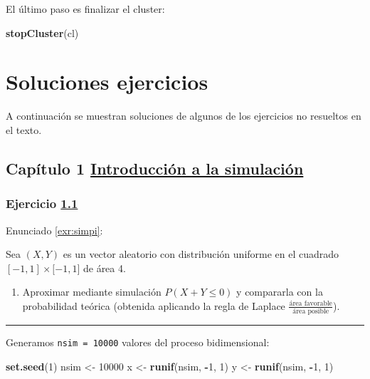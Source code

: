 \documentclass[
  spanish,
  10pt,
]{book}
\newenvironment{Shaded}{\begin{snugshade}}{\end{snugshade}}
\newcommand{\DecValTok}[1]{\textcolor[rgb]{0.00,0.00,0.81}{#1}}
\newcommand{\FunctionTok}[1]{\textcolor[rgb]{0.13,0.29,0.53}{\textbf{#1}}}
\newcommand{\NormalTok}[1]{#1}
\newcommand{\OtherTok}[1]{\textcolor[rgb]{0.56,0.35,0.01}{#1}}
\newcommand{\SpecialCharTok}[1]{\textcolor[rgb]{0.81,0.36,0.00}{\textbf{#1}}}
\providecommand{\tightlist}{%
  \setlength{\itemsep}{0pt}\setlength{\parskip}{0pt}}
\theoremstyle{break}
\theoremstyle{nonumberplain}
\begin{document}
El último paso es finalizar el cluster:

\begin{Shaded}
\begin{Highlighting}[]
\FunctionTok{stopCluster}\NormalTok{(cl)}
\end{Highlighting}
\end{Shaded}

\chapter{Soluciones ejercicios}\label{soluciones}

A continuación se muestran soluciones de algunos de los ejercicios no resueltos en el texto.

\section{\texorpdfstring{Capítulo 1 \href{intro.html}{Introducción a la simulación}}{Capítulo 1 Introducción a la simulación}}\label{capuxedtulo-1-introducciuxf3n-a-la-simulaciuxf3n}

\subsection{\texorpdfstring{Ejercicio \href{ejercicios.html\#exr:simpi}{1.1}}{Ejercicio 1.1}}\label{sol-simpi}

Enunciado \ref{exr:simpi}:

Sea \((X,Y)\) es un vector aleatorio con distribución uniforme en el
cuadrado \([-1,1]\times\lbrack-1,1]\) de área 4.

\begin{enumerate}
\def\labelenumi{\alph{enumi})}
\tightlist
\item
  Aproximar mediante simulación \(P\left(X + Y \leq 0 \right)\) y
  compararla con la probabilidad teórica (obtenida aplicando la
  regla de Laplace \(\frac{\text{área favorable}}{\text{área posible}}\)).
\end{enumerate}

\begin{center}\rule{0.5\linewidth}{0.5pt}\end{center}

Generamos \texttt{nsim\ =\ 10000} valores del proceso bidimensional:

\begin{Shaded}
\begin{Highlighting}[]
\FunctionTok{set.seed}\NormalTok{(}\DecValTok{1}\NormalTok{)}
\NormalTok{nsim }\OtherTok{\textless{}{-}} \DecValTok{10000}
\NormalTok{x }\OtherTok{\textless{}{-}} \FunctionTok{runif}\NormalTok{(nsim, }\SpecialCharTok{{-}}\DecValTok{1}\NormalTok{, }\DecValTok{1}\NormalTok{)}
\NormalTok{y }\OtherTok{\textless{}{-}} \FunctionTok{runif}\NormalTok{(nsim, }\SpecialCharTok{{-}}\DecValTok{1}\NormalTok{, }\DecValTok{1}\NormalTok{)}
\end{Highlighting}
\end{Shaded}
\end{document}
